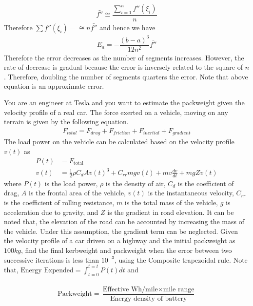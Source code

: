 \documentclass[book.tex]{subfiles}
\begin{document}
\begin{align}
\bar{f''} \cong \dfrac{\sum_{i=1}^{n}f''(\xi_i)}{n}
\end{align}
Therefore $\sum f''(\xi_i) = \cong n\bar{f''}$ and hence we have
\begin{align}
E_a = -\dfrac{(b-a)^3}{12n^2}\bar{f''}
\end{align}
Therefore the error decreases as the number of segments increases. However, the rate of decrease is gradual because the error is inversely related to the square of $n$. Therefore, doubling the number of segments quarters the error. Note that above equation is an approximate error.\\
\begin{example}
You are an engineer at Tesla and you want to estimate the packweight given the velocity profile of a real car. The force exerted on a vehicle, moving on any terrain is given by the following equation.
\begin{align}
F_{total} = F_{drag}+F_{friction}+F_{inertial}+F_{gradient}
\end{align}
The load power on the vehicle can be calculated based on the velocity profile $v(t)$ as
\begin{align}
P(t) &= F_{\textrm{total}} \\
v(t) &= \frac{1}{2}\rho C_dA v(t)^3 + C_{rr}mg v(t) + mv \frac{dv}{dt} + mgZ v(t)
\end{align}
where $P(t)$ is the load power, $\rho$ is the density of air, $C_d$ is the coefficient of drag, $A$ is the frontal area of the vehicle, $v(t)$ is the instantaneous velocity, $C_{rr}$ is the coefficient of rolling resistance, $m$ is the total mass of the vehicle, $g$ is acceleration due to gravity, and $Z$ is the gradient in road elevation. It can be noted that, the elevation of the road can be accounted by increasing the mass of the vehicle. Under this assumption, the gradient term can be neglected. Given the velocity profile of a car driven on a highway and the initial packweight as $100 kg$, find the final kerbweight and packweight when the error between two successive iterations is less than $10^{-3}$, using the Composite trapezoidal rule. Note that, $\text{Energy Expended} = \int_{t=0}^{t=t}P(t)dt$ and 

\begin{align}
\begin{gathered}
\text{Packweight} = \dfrac{\text{Effective Wh/mile}\times \text{mile range}}{\text{Energy density of battery}}
\end{gathered}
\end{align}


\end{example}
\end{document}
